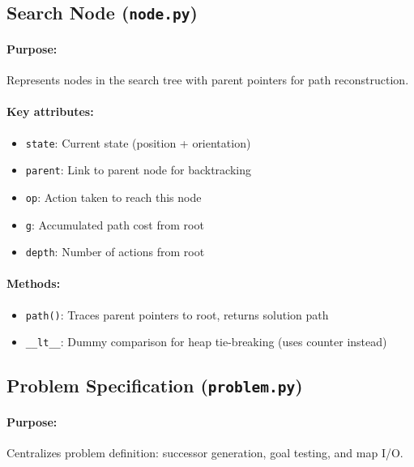 \documentclass[11pt,a4paper]{article}
\begin{document}
\subsection{Search Node (\texttt{node.py})}

\paragraph{Purpose:} Represents nodes in the search tree with parent pointers for path reconstruction.

\paragraph{Key attributes:}
\begin{itemize}[leftmargin=1.5cm,itemsep=0.1em]
    \item \texttt{state}: Current state (position + orientation)
    \item \texttt{parent}: Link to parent node for backtracking
    \item \texttt{op}: Action taken to reach this node
    \item \texttt{g}: Accumulated path cost from root
    \item \texttt{depth}: Number of actions from root
\end{itemize}

\paragraph{Methods:}
\begin{itemize}[leftmargin=1.5cm,itemsep=0.1em]
    \item \texttt{path()}: Traces parent pointers to root, returns solution path
    \item \texttt{\_\_lt\_\_}: Dummy comparison for heap tie-breaking (uses counter instead)
\end{itemize}

\subsection{Problem Specification (\texttt{problem.py})}

\paragraph{Purpose:} Centralizes problem definition: successor generation, goal testing, and map I/O.
\end{document}
